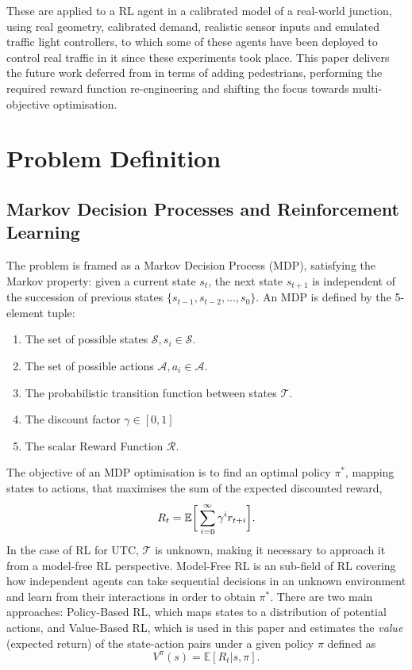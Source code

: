 \documentclass[a4paper, conference]{IEEEtran}
\begin{document}
These are applied to a RL agent in a calibrated model of a real-world junction, using real geometry, calibrated demand, realistic sensor inputs and emulated traffic light controllers, to which some of these agents have been deployed to control real traffic in it since these experiments took place.
This paper delivers the future work deferred from \cite{previous} in terms of adding pedestrians, performing the required reward function re-engineering and shifting the focus towards multi-objective optimisation.
\section{Problem Definition}
\label{problem}
\subsection{Markov Decision Processes and Reinforcement Learning}
The problem is framed as a Markov Decision Process (MDP), satisfying the Markov property: given a current state $s_t$, the next state $s_{t+1}$ is independent of the succession of previous states $\{s_{t-1}, s_{t-2}, ..., s_0\}$.
An MDP is defined by the 5-element tuple:
\begin{enumerate}
\item The set of possible states $\mathcal{S}, s_i\in \mathcal{S}$.
\item The set of possible actions $\mathcal{A}, a_i\in \mathcal{A}$.
\item The probabilistic transition function between states $\mathcal{T}$.
\item The discount factor $\gamma \in [0,1]$ 
\item The scalar Reward Function $\mathcal{R}$. 
\end{enumerate}

The objective of an MDP optimisation is to find an optimal policy $\pi^*$, mapping states to actions, that maximises the sum of the expected discounted reward,
\begin{equation}
R_t = \mathbb{E} \bigg{[} \sum^{\infty}_{i=0} \gamma^i r_{t+i} \bigg{]} .
\label{eq:reward}
\end{equation}
In the case of RL for UTC, $\mathcal{T}$ is unknown, making it necessary to approach it from a model-free RL perspective.
Model-Free RL is an sub-field of RL covering how independent agents can take sequential decisions in an unknown environment and learn from their interactions in order to obtain $\pi^*$. 
There are two main approaches: Policy-Based RL, which maps states to a distribution of potential actions, and Value-Based RL, which is used in this paper and estimates the {\em value} (expected return) of the state-action pairs under a given policy $\pi$ defined  as
\begin{equation}
V^{\pi}(s) = \mathbb{E} [R_t|s,\pi].
\label{eq:value}
\end{equation}
\end{document}
